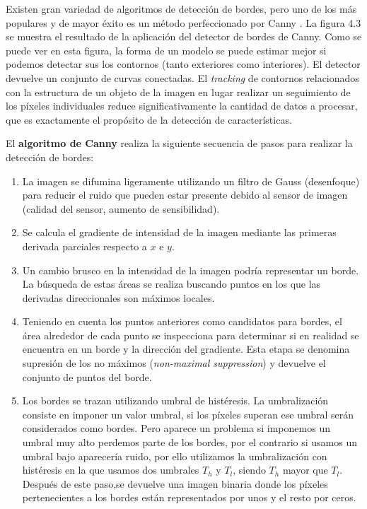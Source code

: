 Existen gran variedad de algoritmos de detección de bordes, pero uno de los más populares y de mayor éxito es un método perfeccionado por Canny \cite{Canny}. La figura 4.3 se muestra el resultado de la aplicación del detector de bordes de Canny. Como se puede ver en esta figura, la forma de un modelo se puede estimar mejor si podemos detectar sus los contornos (tanto exteriores como interiores). El detector devuelve un conjunto de curvas conectadas. El \textit{tracking} de contornos relacionados con la estructura de un objeto de la imagen en lugar realizar un seguimiento de los píxeles individuales reduce significativamente la cantidad de datos a procesar, que es exactamente el propósito de la detección de características. 

El \textbf{algoritmo de Canny} realiza la siguiente secuencia de pasos para realizar la detección de bordes: 
\begin{enumerate}
\item La imagen se difumina ligeramente utilizando un filtro de Gauss (desenfoque) para reducir el ruido que pueden estar presente debido al sensor de imagen (calidad del sensor, aumento de sensibilidad). 
\item Se calcula el gradiente de intensidad de la imagen mediante las primeras derivada parciales respecto a $x$ e $y$. 
\item Un cambio brusco en la intensidad de la imagen podría representar un borde. La búsqueda de estas áreas se realiza buscando puntos en los que las derivadas direccionales son máximos locales. 
\item Teniendo en cuenta los puntos anteriores como candidatos para bordes, el área alrededor de cada punto se inspecciona para determinar si en realidad se encuentra en un borde y la dirección del gradiente. Esta etapa se denomina supresión de los no máximos (\emph{non-maximal suppression}) y devuelve el conjunto de puntos del borde. 
\item Los bordes se trazan utilizando umbral de histéresis. La umbralización consiste en imponer un valor umbral, si los píxeles superan ese umbral serán considerados como bordes. Pero aparece un problema si imponemos un umbral muy alto perdemos parte de los bordes, por el contrario si usamos un umbral bajo aparecería ruido, por ello utilizamos la umbralización con histéresis en la que usamos dos umbrales $T_{h}$ y $T_{l}$, siendo $T_{h}$ mayor que $T_{l}$. Después de este paso,se devuelve una imagen binaria donde los píxeles pertenecientes a los bordes están representados por unos y el resto por ceros. 
\end{enumerate}

